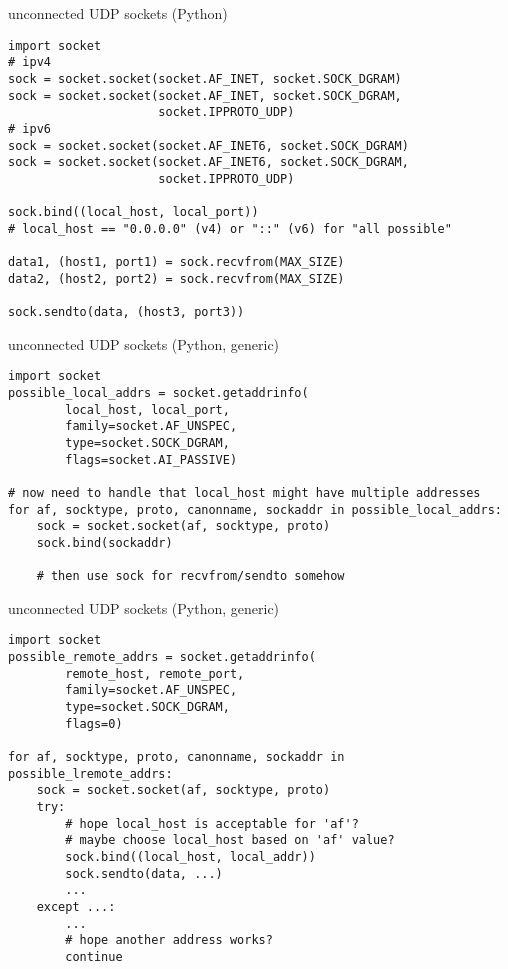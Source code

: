 \begin{frame}[fragile]{unconnected UDP sockets (Python)}
\begin{Verbatim}[fontsize=\small]
import socket
# ipv4
sock = socket.socket(socket.AF_INET, socket.SOCK_DGRAM)
sock = socket.socket(socket.AF_INET, socket.SOCK_DGRAM,
                     socket.IPPROTO_UDP)
# ipv6
sock = socket.socket(socket.AF_INET6, socket.SOCK_DGRAM)
sock = socket.socket(socket.AF_INET6, socket.SOCK_DGRAM,
                     socket.IPPROTO_UDP)

sock.bind((local_host, local_port))
# local_host == "0.0.0.0" (v4) or "::" (v6) for "all possible"

data1, (host1, port1) = sock.recvfrom(MAX_SIZE)
data2, (host2, port2) = sock.recvfrom(MAX_SIZE)

sock.sendto(data, (host3, port3))
\end{Verbatim}
\end{frame}

\begin{frame}[fragile]{unconnected UDP sockets (Python, generic)}
\begin{Verbatim}[fontsize=\small]
import socket
possible_local_addrs = socket.getaddrinfo(
        local_host, local_port,
        family=socket.AF_UNSPEC,
        type=socket.SOCK_DGRAM,
        flags=socket.AI_PASSIVE)

# now need to handle that local_host might have multiple addresses
for af, socktype, proto, canonname, sockaddr in possible_local_addrs:
    sock = socket.socket(af, socktype, proto)
    sock.bind(sockaddr)
    
    # then use sock for recvfrom/sendto somehow
\end{Verbatim}
\end{frame}

\begin{frame}[fragile]{unconnected UDP sockets (Python, generic)}
\begin{Verbatim}[fontsize=\small]
import socket
possible_remote_addrs = socket.getaddrinfo(
        remote_host, remote_port,
        family=socket.AF_UNSPEC,
        type=socket.SOCK_DGRAM,
        flags=0)

for af, socktype, proto, canonname, sockaddr in possible_lremote_addrs:
    sock = socket.socket(af, socktype, proto)
    try:
        # hope local_host is acceptable for 'af'?
        # maybe choose local_host based on 'af' value?
        sock.bind((local_host, local_addr))
        sock.sendto(data, ...)
        ...
    except ...:
        ...
        # hope another address works?
        continue
\end{Verbatim}
\end{frame}

